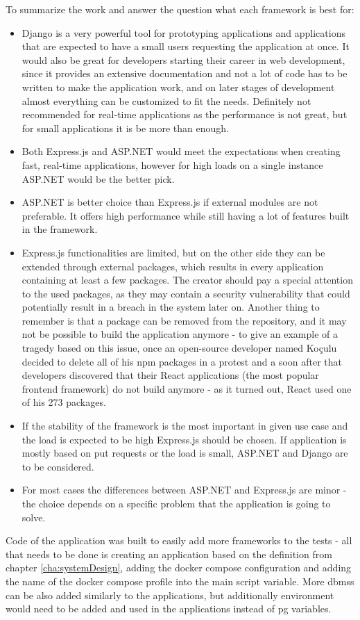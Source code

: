 To summarize the work and answer the question what each framework is best for:
\begin{itemize}
    \item Django is a very powerful tool for prototyping applications and applications that are expected to have a small users requesting the application at once. It would also be great for developers starting their career in web development, since it provides an extensive documentation and not a lot of code has to be written to make the application work, and on later stages of development almost everything can be customized to fit the needs. Definitely not recommended for real-time applications as the performance is not great, but for small applications it is be more than enough.
    \item Both Express.js and ASP.NET would meet the expectations when creating fast, real-time applications, however for high loads on a single instance ASP.NET would be the better pick.
    \item ASP.NET is better choice than Express.js if external modules are not preferable. It offers high performance while still having a lot of features built in the framework.
    \item Express.js functionalities are limited, but on the other side they can be extended through external packages, which results in every application containing at least a few packages. The creator should pay a special attention to the used packages, as they may contain a security vulnerability that could potentially result in a breach in the system later on. Another thing to remember is that a package can be removed from the repository, and it may not be possible to build the application anymore - to give an example of a tragedy based on this issue, once an open-source developer named Koçulu decided to delete all of his npm packages in a protest and a soon after that developers discovered that their React applications (the most popular frontend framework) do not build anymore - as it turned out, React used one of his 273 packages.
    \item If the stability of the framework is the most important in given use case and the load is expected to be high Express.js should be chosen. If application is mostly based on put requests or the load is small, ASP.NET and Django are to be considered.
    \item For most cases the differences between ASP.NET and Express.js are minor - the choice depends on a specific problem that the application is going to solve.
\end{itemize}

Code of the application was built to easily add more frameworks to the tests - all that needs to be done is creating an application based on the definition from chapter \ref{cha:systemDesign}, adding the docker compose configuration and adding the name of the docker compose profile into the main script variable. More \acrlong{dbms}s can be also added similarly to the applications, but additionally environment would need to be added and used in the applications instead of \acrlong{pg} variables.
